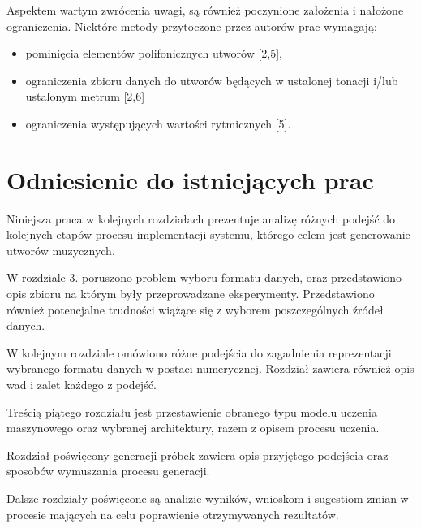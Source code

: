 {{    Aspektem wartym zwrócenia uwagi, są również poczynione założenia i nałożone
    ograniczenia. Niektóre metody przytoczone przez autorów prac wymagają:
    \begin{itemize}
      \item pominięcia elementów polifonicznych utworów [2,5],
      \item ograniczenia zbioru danych do utworów będących w 
      ustalonej tonacji i/lub ustalonym metrum [2,6]
      \item ograniczenia występujących wartości rytmicznych [5].
    \end{itemize}
  }

  \section{Odniesienie do istniejących prac}
  {
    Niniejsza praca w kolejnych rozdziałach prezentuje analizę różnych podejść do kolejnych etapów
    procesu implementacji systemu, którego celem jest generowanie utworów muzycznych. 

    W rozdziale 3. poruszono problem wyboru formatu danych, oraz przedstawiono opis zbioru na którym
    były przeprowadzane eksperymenty. Przedstawiono również potencjalne trudności wiążące się z wyborem
    poszczególnych źródeł danych.

    W kolejnym rozdziale omówiono różne podejścia do zagadnienia reprezentacji wybranego formatu 
    danych w postaci numerycznej. Rozdział zawiera również opis wad i zalet każdego z podejść.

    Treścią piątego rozdziału jest przestawienie obranego typu modelu uczenia maszynowego oraz 
    wybranej architektury, razem z opisem procesu uczenia.

    Rozdział poświęcony generacji próbek zawiera opis przyjętego podejścia oraz sposobów 
    wymuszania procesu generacji.

    Dalsze rozdziały poświęcone są analizie wyników, wnioskom i sugestiom zmian w procesie mających na celu 
    poprawienie otrzymywanych rezultatów.
  }

}

